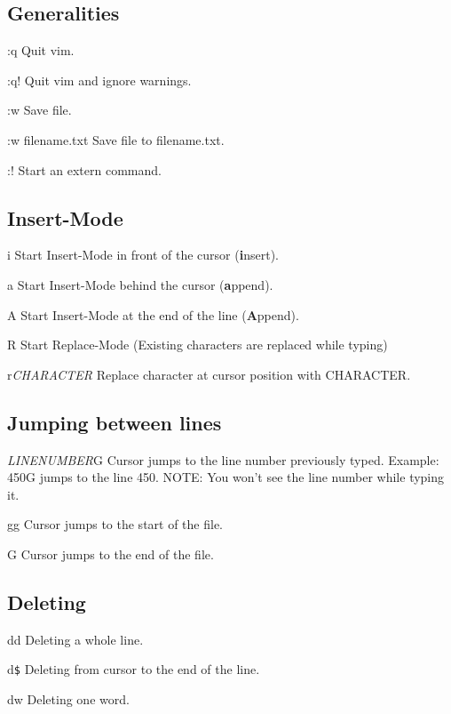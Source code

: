 \documentclass[10pt,a4paper]{scrartcl}
\begin{document}
\subsection{Generalities}
\begin{description}
\item{:q} Quit vim.
\item{:q!} Quit vim and ignore warnings.
\item{:w} Save file.
\item{:w filename.txt} Save file to filename.txt.
\item{:!} Start an extern command.
\end{description}

\subsection{Insert-Mode}
\begin{description}
\item{i} Start Insert-Mode in front of the cursor (\textbf{i}nsert).
\item{a} Start Insert-Mode behind the cursor (\textbf{a}ppend).
\item{A} Start Insert-Mode at the end of the line (\textbf{A}ppend).
\item{R} Start Replace-Mode (Existing characters are replaced while typing)
\item{r{\sl CHARACTER}} Replace character at cursor position with CHARACTER.
\end{description}

\subsection{Jumping between lines}
\begin{description}
\item{{\sl LINENUMBER}G} Cursor jumps to the line number previously typed. Example: 450G jumps to the line 450. NOTE: You won't see the line number while typing it.
\item{gg} Cursor jumps to the start of the file.
\item{G} Cursor jumps to the end of the file. 
\end{description}

\subsection{Deleting}
\begin{description}
\item{dd} Deleting a whole line.
\item{d\verb&$&} Deleting from cursor to the end of the line.
\item{dw} Deleting one word.
\end{description}
\end{document}
